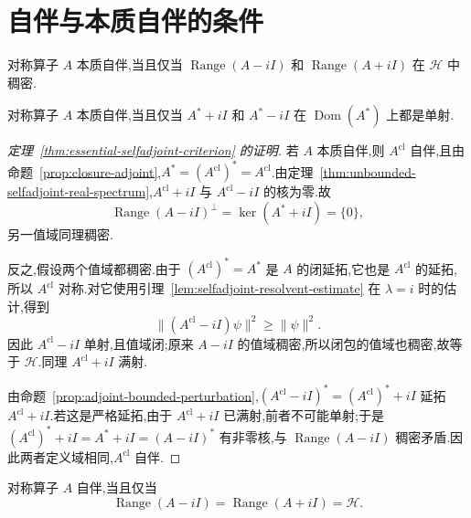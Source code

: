 \section{自伴与本质自伴的条件}
\label{sec:selfadjointness-criteria}

\begin{theorem}[本质自伴性的判据]\label{thm:essential-selfadjoint-criterion}
对称算子 \(A\) 本质自伴,当且仅当 \(\operatorname{Range}(A-iI)\) 和 \(\operatorname{Range}(A+iI)\) 在 \(\mathcal{H}\) 中稠密.
\end{theorem}

\begin{corollary}[用伴随的核刻画本质自伴性]\label{cor:essential-selfadjoint-criterion}
对称算子 \(A\) 本质自伴,当且仅当 \(A^{*}+iI\) 和 \(A^{*}-iI\) 在 \(\operatorname{Dom}(A^{*})\) 上都是单射.
\end{corollary}

\begin{proof}[定理~\ref{thm:essential-selfadjoint-criterion} 的证明]
若 \(A\) 本质自伴,则 \(A^{\mathrm{cl}}\) 自伴,且由命题~\ref{prop:closure-adjoint},\(A^{*}=(A^{\mathrm{cl}})^{*}=A^{\mathrm{cl}}\).由定理~\ref{thm:unbounded-selfadjoint-real-spectrum},\(A^{\mathrm{cl}}+iI\) 与 \(A^{\mathrm{cl}}-iI\) 的核为零.故
\[
\operatorname{Range}(A-iI)^{\perp}=\ker(A^{*}+iI)=\{0\},
\]
另一值域同理稠密.

反之,假设两个值域都稠密.由于 \((A^{\mathrm{cl}})^{*}=A^{*}\) 是 \(A\) 的闭延拓,它也是 \(A^{\mathrm{cl}}\) 的延拓,所以 \(A^{\mathrm{cl}}\) 对称.对它使用引理~\ref{lem:selfadjoint-resolvent-estimate} 在 \(\lambda=i\) 时的估计,得到
\[
\|(A^{\mathrm{cl}}-iI)\psi\|^{2}\geq\|\psi\|^{2}.
\]
因此 \(A^{\mathrm{cl}}-iI\) 单射,且值域闭;原来 \(A-iI\) 的值域稠密,所以闭包的值域也稠密,故等于 \(\mathcal{H}\).同理 \(A^{\mathrm{cl}}+iI\) 满射.

由命题~\ref{prop:adjoint-bounded-perturbation},\((A^{\mathrm{cl}}-iI)^{*}=(A^{\mathrm{cl}})^{*}+iI\) 延拓 \(A^{\mathrm{cl}}+iI\).若这是严格延拓,由于 \(A^{\mathrm{cl}}+iI\) 已满射,前者不可能单射;于是 \((A^{\mathrm{cl}})^{*}+iI=A^{*}+iI=(A-iI)^{*}\) 有非零核,与 \(\operatorname{Range}(A-iI)\) 稠密矛盾.因此两者定义域相同,\(A^{\mathrm{cl}}\) 自伴.
\end{proof}

\begin{proposition}[自伴性的判据]\label{prop:selfadjoint-range-criterion}
对称算子 \(A\) 自伴,当且仅当
\[
\operatorname{Range}(A-iI)=\operatorname{Range}(A+iI)=\mathcal{H}.
\]
\end{proposition}

